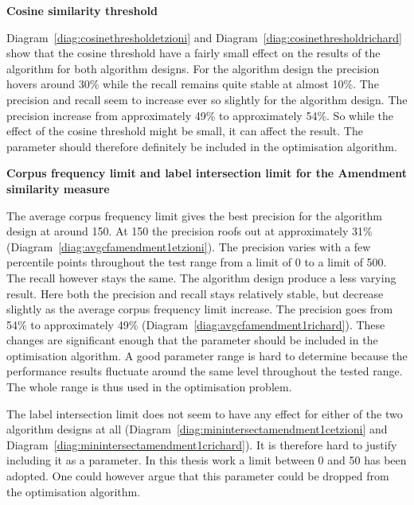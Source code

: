 \textbf{Cosine similarity threshold}

Diagram~\ref{diag:cosinethresholdetzioni} and Diagram~\ref{diag:cosinethresholdrichard} show that the cosine threshold have a fairly small effect on the results of the algorithm for both algorithm designs. For the \citeauthor{Oren1998} algorithm design the precision hovers around 30\% while the recall remains quite stable at almost 10\%. The precision and recall seem to increase ever so slightly for the \citeauthor{Moe2013compact} algorithm design. The precision increase from approximately  49\% to approximately  54\%. So while the effect of the cosine threshold might be small, it can affect the result. The parameter should therefore definitely be included in the optimisation algorithm.


\textbf{Corpus frequency limit and label intersection limit for the Amendment similarity measure}

The average corpus frequency limit gives the best precision for the \citeauthor{Oren1998} algorithm design at around 150. At 150 the precision roofs out at approximately 31\% (Diagram~\ref{diag:avgcfamendment1etzioni}). The precision varies with a few percentile points throughout the test range from a limit of 0 to a limit of 500. The recall however stays the same. The \citeauthor{Moe2013compact} algorithm design produce a less varying result. Here both the precision and recall stays relatively stable, but decrease slightly as the average corpus frequency limit increase. The precision goes from 54\% to approximately 49\% (Diagram~\ref{diag:avgcfamendment1richard}). These changes are significant enough that the parameter should be included in the optimisation algorithm. A good parameter range is hard to determine because the performance results fluctuate around the same level throughout the tested range. The whole range is thus used in the optimisation problem.

The label intersection limit does not seem to have any effect for either of the two algorithm designs at all (Diagram~\ref{diag:minintersectamendment1cetzioni} and Diagram~\ref{diag:minintersectamendment1crichard}). It is therefore hard to justify including it as a parameter. In this thesis work a limit between 0 and 50 has been adopted. One could however argue that this parameter could be dropped from the optimisation algorithm.

